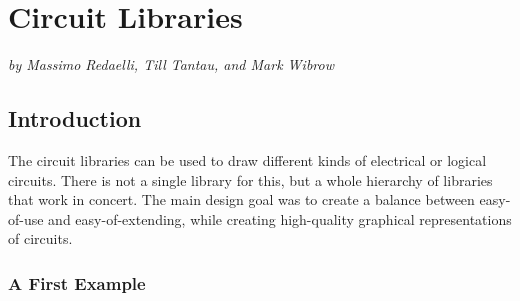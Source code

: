 %
%
%


\section{Circuit Libraries}
\label{section-library-circuits}

\emph{by Massimo Redaelli, Till Tantau, and Mark Wibrow}

\subsection{Introduction}

The circuit libraries can be used to draw different kinds of
electrical or logical circuits. There is not a single library for
this, but a whole hierarchy of libraries that work in concert. The
main design goal was to create a balance between easy-of-use and
easy-of-extending, while creating high-quality graphical
representations of circuits. 

\subsubsection{A First Example}

